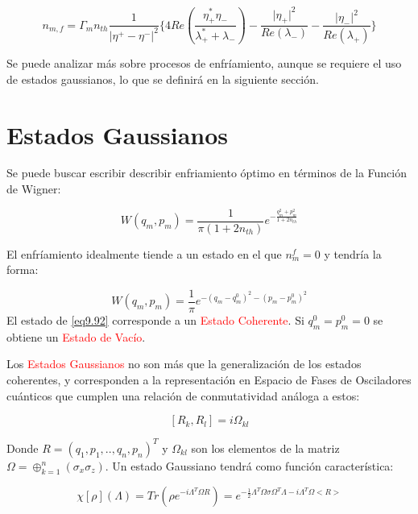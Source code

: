 \documentclass{book}
\begin{document}
\begin{equation}\label{eq9.90}n_{m,f}=\Gamma_mn_{th}\frac{1}{\lvert\eta^+-\eta^-\lvert^2}\{4Re(\frac{\eta^*_+\eta_-}{\lambda^*_++\lambda_-})-\frac{\lvert\eta_+\rvert^2}{Re(\lambda_-)}-\frac{\lvert\eta_-\rvert^2}{Re(\lambda_+)}\}\end{equation}

Se puede analizar más sobre procesos de enfríamiento, aunque se requiere el uso de estados gaussianos, lo que se definirá en la siguiente sección.

\section{Estados Gaussianos}

Se puede buscar escribir describir enfriamiento óptimo en términos de la Función de Wigner:

\begin{equation}\label{eq9.91}W(q_m,p_m)=\frac{1}{\pi(1+2n_{th})}e^{-\frac{q_m^2+p_m^2}{1+2n_{th}}}\end{equation}

El enfríamiento idealmente tiende a un estado en el que $n_m^f=0$ y tendría la forma:

\begin{equation}\label{eq9.92}W(q_m,p_m)=\frac{1}{\pi}e^{-(q_m-q_m^0)^2-(p_m-p_m^0)^2}\end{equation} El estado de \ref{eq9.92} corresponde a un \textcolor{red}{Estado Coherente}. Si $q_m^0=p_m^0=0$ se obtiene un \textcolor{red}{Estado de Vacío}.

Los \textcolor{red}{Estados Gaussianos} no son más que la generalización de los estados coherentes, y corresponden a la representación en Espacio de Fases de Osciladores cuánticos que cumplen una relación de conmutatividad análoga a estos:

\begin{equation}\label{eq9.93}[R_k,R_l]=i\Omega_{kl}\end{equation}

Donde $R=(q_1,p_1,..,q_n,p_n)^T$ y $\Omega_{kl}$ son los elementos de la matriz $\Omega=\oplus_{k=1}^n (\sigma_x\sigma_z)$. Un estado Gaussiano tendrá como función característica:

\begin{equation}\label{eq9.94}\chi[\rho](\Lambda)=Tr(\rho e^{-i\Lambda^T\Omega R})=e^{-\frac{1}{2}\Lambda^T\Omega\sigma\Omega^T\Lambda-i\Lambda^T\Omega<R>}\end{equation}
\end{document}
